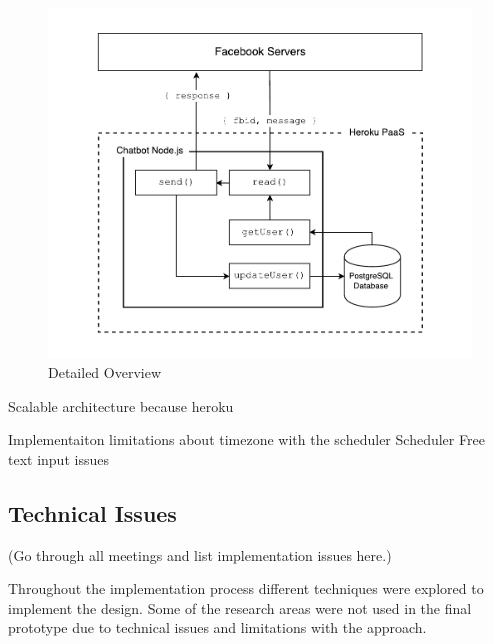 \begin{figure}[H]
    \centering
    \includegraphics[width=6in]{../resources/diagrams/chatbot-detailed-overview.pdf}
    \caption{Detailed Overview}
    \label{fig:prototype_detailed_overview}
\end{figure}

Scalable architecture because heroku\newline

Implementaiton limitations about timezone with the scheduler\newline
Scheduler\newline
Free text input issues\newline

\subsection*{Technical Issues}
(Go through all meetings and list implementation issues here.)

Throughout the implementation process different techniques were explored to implement the design.
Some of the research areas were not used in the final prototype due to technical issues and limitations with the approach.

